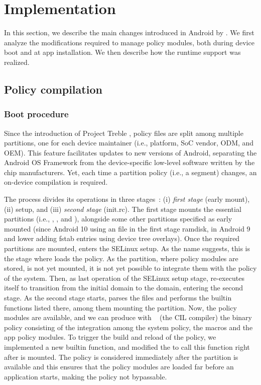\section{Implementation}\label{sect:seapp_implementation}

In this section, we describe the main changes introduced in Android by
\pap.  We first analyze the modifications required to manage policy
modules, both during device boot and at app installation.  We then
describe how the runtime support was realized.

\subsection{Policy compilation}\label{sect:seapp_syst_impl}

\subsubsection{Boot procedure}

Since the introduction of Project Treble \cite{seapp_treble}, policy
files are split among multiple partitions, one for each device
maintainer (i.e., platform, SoC vendor, ODM, and OEM).  This feature
facilitates updates to new versions of Android, separating the Android
OS Framework from the device-specific low-level software written by
the chip manufacturers.  Yet, each time a partition policy (i.e., a
segment) changes, an on-device compilation is required.

The \init process divides its operations in three
stages~\cite{seapp_initstages}: (i) {\em first stage} (early mount),
(ii) \sel setup, and (iii) {\em second stage} (init.rc).  The first
stage mounts the essential partitions (i.e., \dev, \proc, \sys and
\selinuxfsfull), alongside some other partitions specified as early
mounted (since Android 10 using an \fstab file in the first stage
ramdisk, in Android 9 and lower adding fstab entries using device tree
overlays).  Once the required partitions are mounted, \init enters the
SELinux setup.  As the name suggests, this is the stage where \init
loads the \sel policy.  As the \data partition, where policy modules
are stored, is not yet mounted, it is not yet possible to integrate
them with the policy of the system.  Then, as last operation of the
SELinux setup stage, \init re-executes itself to transition from the
initial  domain to the \initdomain domain, entering the second
stage.  As the second stage starts, \init parses the \initrc files and
performs the builtin functions listed there, among them mounting the
\data partition.  Now, the policy modules are available, and we can
produce with \secilc~\cite{seapp_secilccom} (the \sel CIL compiler)
the binary policy consisting of the integration among the system
policy, the \pap macros and the app policy modules.  To trigger the
build and reload of the policy, we implemented a new builtin function,
and modified the \initrc to call this function right after \data is
mounted.  The policy is considered immediately after the \data
partition is available and this ensures that the policy modules are
loaded far before an application starts, making the policy not
bypassable.

